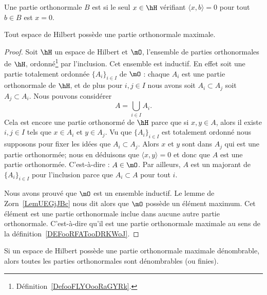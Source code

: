 \begin{definition}      \label{DEFooRFATooDRKWoJ}
	Une partie orthonormale \( B\) est  si le seul \( x\in \hH\) vérifiant \( \langle x, b\rangle =0\) pour tout \( b\in B\) est \( x=0\).
\end{definition}

\begin{lemma}\label{LEMooXIECooCAQeJN}
	Tout espace de Hilbert possède une partie orthonormale maximale.
\end{lemma}

\begin{proof}
	Soit \( \hH\) un espace de Hilbert et \( \mO\), l'ensemble de parties orthonormales de \( \hH\), ordonné\footnote{Définition~\ref{DefooFLYOooRaGYRk}.} par l'inclusion. Cet ensemble est inductif. En effet soit une partie totalement ordonnée \( \{ A_i \}_{i\in I}\) de \( \mO\) : chaque \( A_i\) est une partie orthonormale de \( \hH\), et de plus pour \( i,j\in I\) nous avons soit \( A_i\subset A_j\) soit \( A_j\subset A_i\). Nous pouvons considérer
	\begin{equation}
		A=\bigcup_{i\in I}A_i.
	\end{equation}
	Cela est encore une partie orthonormé de \( \hH\) parce que si \( x,y\in A\), alors il existe \( i,j\in I\) tels que \( x\in A_i\) et \( y\in A_j\). Vu que \( \{ A_i \}_{i\in I}\) est totalement ordonné nous supposons pour fixer les idées que \( A_i\subset A_j\). Alors \(x \) et \( y\) sont dans \( A_j\) qui est une partie orthonormée; nous en déduisons que \( \langle x, y\rangle =0\) et donc que \( A\) est une partie orthonormée. C'est-à-dire : \( A\in \mO\). Par ailleurs, \( A\) est un majorant de \( \{ A_i \}_{i\in I}\) pour l'inclusion parce que \( A_i\subset A\) pour tout \( i\).

	Nous avons prouvé que \( \mO\) est un ensemble inductif. Le lemme de Zorn~\ref{LemUEGjJBc} nous dit alors que \( \mO\) possède un élément maximum. Cet élément est une partie orthonormale inclue dans aucune autre partie orthonormale. C'est-à-dire qu'il est une partie orthonormale maximale au sens de la définition~\ref{DEFooRFATooDRKWoJ}.
\end{proof}

\begin{proposition}      \label{PROPooENTIooIplRAS}
	Si un espace de Hilbert possède une partie orthonormale maximale dénombrable, alors toutes les parties orthonormales sont dénombrables (ou finies).
\end{proposition}

